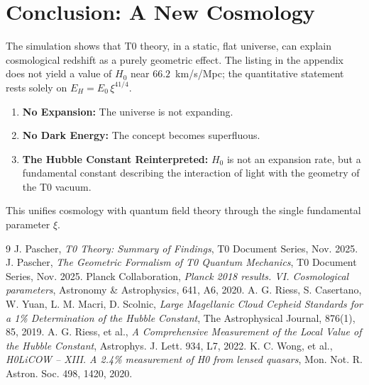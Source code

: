 	\section{Conclusion: A New Cosmology}
	The simulation shows that T0 theory, in a static, flat universe, can explain cosmological redshift as a purely geometric effect. The listing in the appendix does not yield a value of $H_0$ near $66.2$~km/s/Mpc; the quantitative statement rests solely on $E_H = E_0\,\xi^{41/4}$.
	\begin{enumerate}
		\item \textbf{No Expansion:} The universe is not expanding.
		\item \textbf{No Dark Energy:} The concept becomes superfluous.
		\item \textbf{The Hubble Constant Reinterpreted:} $H_0$ is not an expansion rate, but a fundamental constant describing the interaction of light with the geometry of the T0 vacuum.
	\end{enumerate}
	This unifies cosmology with quantum field theory through the single fundamental parameter $\xi$.
	\begin{thebibliography}{9}
		J. Pascher, \textit{T0 Theory: Summary of Findings}, T0 Document Series, Nov. 2025.
		J. Pascher, \textit{The Geometric Formalism of T0 Quantum Mechanics}, T0 Document Series, Nov. 2025.
		Planck Collaboration, \textit{Planck 2018 results. VI. Cosmological parameters}, Astronomy \& Astrophysics, 641, A6, 2020.
		A. G. Riess, S. Casertano, W. Yuan, L. M. Macri, D. Scolnic, \textit{Large Magellanic Cloud Cepheid Standards for a 1\% Determination of the Hubble Constant}, The Astrophysical Journal, 876(1), 85, 2019.
		A. G. Riess, et al., \textit{A Comprehensive Measurement of the Local Value of the Hubble Constant}, Astrophys. J. Lett. 934, L7, 2022.
		K. C. Wong, et al., \textit{H0LiCOW -- XIII. A 2.4\% measurement of H0 from lensed quasars}, Mon. Not. R. Astron. Soc. 498, 1420, 2020.
	\end{thebibliography}
